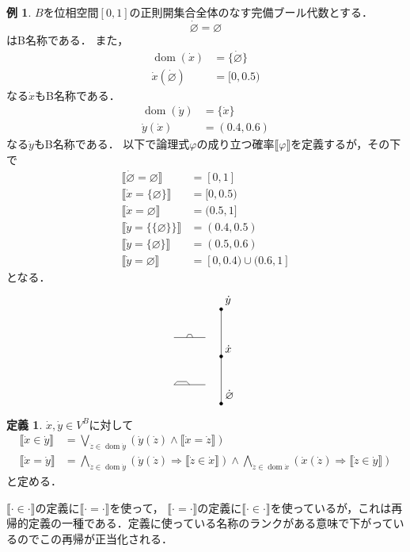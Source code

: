 \documentclass[uplatex,dvipdfmx]{jsarticle}
\newcommand{\dom}{\operatorname{dom}}
\renewcommand\emptyset{\varnothing}
\newcommand{\truth}[1] {\llbracket #1 \rrbracket}
\theoremstyle{definition}
\newtheorem{defi}[thm]{定義}
\newtheorem{exm}[thm]{例}
\begin{document}
\begin{exm}
$B$を位相空間$[0, 1]$の正則開集合全体のなす完備ブール代数とする．
\[
\dot{\emptyset} = \emptyset
\]
はB名称である．
また，
\begin{align*}
\dom(\dot{x}) &= \{\dot{\emptyset}\} \\
\dot{x}(\dot{\emptyset}) &= [0, 0.5)
\end{align*}
なる$\dot{x}$もB名称である．
\begin{align*}
\dom(\dot{y}) &= \{\dot{x}\} \\
\dot{y}(\dot{x}) &= (0.4, 0.6)
\end{align*}
なる$\dot{y}$もB名称である．
以下で論理式$\varphi$の成り立つ確率$\truth{\varphi}$を定義するが，その下で
\begin{align*}
\truth{\dot{\emptyset} = \emptyset} &= [0, 1] \\
\truth{\dot{x} = \{\emptyset\}} &= [0, 0.5) \\
\truth{\dot{x} = \emptyset} &= (0.5, 1] \\
\truth{\dot{y} = \{\{\emptyset\}\}} &= (0.4, 0.5) \\
\truth{\dot{y} = \{\emptyset\}} &= (0.5, 0.6) \\
\truth{\dot{y} = \emptyset} &= [0, 0.4) \cup (0.6, 1] \end{align*}
となる．
\[
\begin{tikzpicture}
\draw (0,0) -- (0,3);

\draw [fill=black] (0,0) circle (0.05) node[above right] {$\dot{\emptyset}$};
\draw [fill=black] (0,1.5) circle (0.05) node[above right] {$\dot{x}$};
\draw [fill=black] (0,3) circle (0.05) node[above right] {$\dot{y}$};

\draw (-1.5,0.6) -- (-0.5,0.6);
\draw (-1.5,0.6) -- (-1.4,0.7) --  (-1.1,0.7) -- (-1,0.6);

\draw (-1.5,2.1) -- (-0.5,2.1);
\draw (-1.1,2.1) -- (-1.05,2.2) -- (-0.95,2.2) -- (-0.9,2.1);

\end{tikzpicture}
\]
\end{exm}

\begin{defi}\label{atomicfml}
$\dot{x}, \dot{y} \in V^B$に対して
\begin{align*}
\truth{\dot{x} \in \dot{y}} &= \bigvee_{\dot{z} \in \dom \dot{y}} (\dot{y}(\dot{z}) \land \truth{\dot{x} = \dot{z}}) \\
\truth{\dot{x} = \dot{y}} &= \bigwedge_{\dot{z} \in \dom \dot{y}} (\dot{y}(\dot{z}) \Rightarrow \truth{\dot{z} \in \dot{x}}) \land \bigwedge_{\dot{z} \in \dom \dot{x}} (\dot{x}(\dot{z}) \Rightarrow \truth{\dot{z} \in \dot{y}})
\end{align*}
と定める．
\end{defi}
$\truth{\cdot \in \cdot}$の定義に$\truth{\cdot = \cdot}$を使って，
$\truth{\cdot = \cdot}$の定義に$\truth{\cdot \in \cdot}$を使っているが，これは再帰的定義の一種である．定義に使っている名称のランクがある意味で下がっているのでこの再帰が正当化される．
\end{document}

